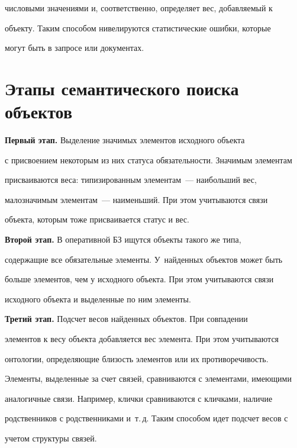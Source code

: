 числовыми значениями и, соответственно, определяет вес, добавляемый к 


объекту. Таким способом нивелируются статистические ошибки, которые 


могут быть в запросе или документах.


    


\section{Этапы семантического поиска объектов} 


    


    \textbf{Первый этап.} Выделение значимых элементов исходного объекта 


с присвоением некоторым из них статуса обязательности. Значимым элементам 


присваиваются веса: типизированным элементам~--- наибольший вес, 


малозначимым элементам~--- наименьший. При этом учитываются связи 


объекта, которым тоже присваивается статус и вес.


    


    \textbf{Второй этап.} В оперативной БЗ ищутся объекты такого же типа, 


содержащие все обязательные элементы. У~найденных объектов может быть 


больше элементов, чем у исходного объекта. При этом учитываются связи 


исходного объекта и выделенные по ним элементы. 


    


    \textbf{Третий этап.} Подсчет весов найденных объектов. При совпадении 


элементов к весу объекта добавляется вес элемента. При этом учитываются 


онтологии, определяющие близость элементов или их противоречивость. 


Элементы, выделенные за счет связей, сравниваются с элементами, имеющими 


аналогичные связи. Например, клички сравниваются с кличками, наличие 


родственников с родственниками и~т.\,д. Таким способом идет подсчет весов с 


учетом структуры связей.


